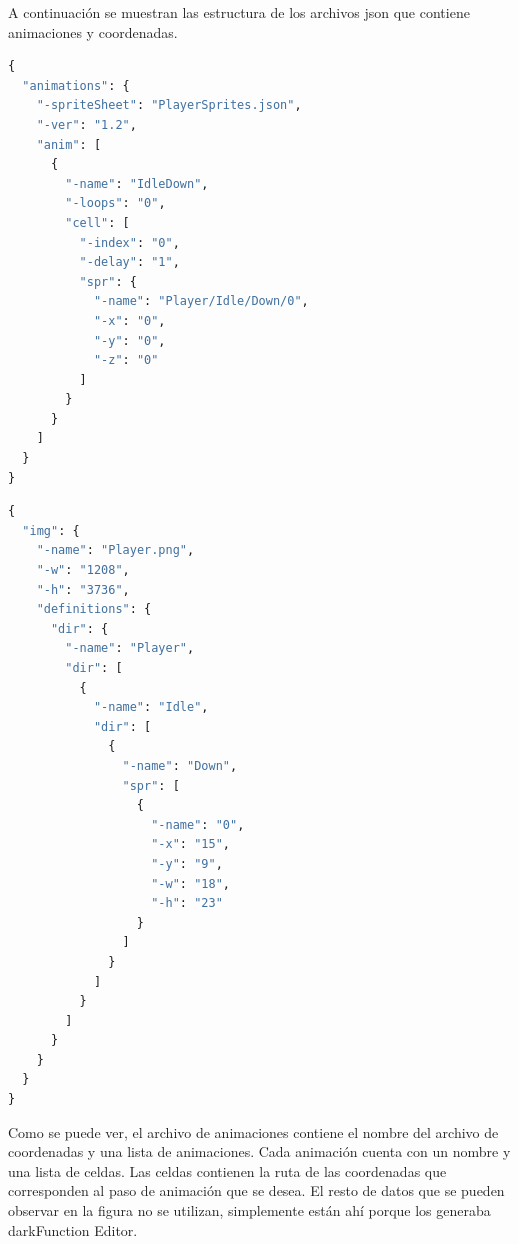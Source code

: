 		A continuación se muestran las estructura de los archivos \acrshort{json} que contiene animaciones y coordenadas.

		\begin{center}
		\begin{minipage}{.6\textwidth}
		\begin{lstlisting}[caption={Estructura de las animaciones en \acrshort{json}},label={lst:animjson},language=Python]
{
  "animations": {
    "-spriteSheet": "PlayerSprites.json",
    "-ver": "1.2",
    "anim": [
      {
        "-name": "IdleDown",
        "-loops": "0",
        "cell": [
          "-index": "0",
          "-delay": "1",
          "spr": {
            "-name": "Player/Idle/Down/0",
            "-x": "0",
            "-y": "0",
            "-z": "0"
          ]
        }
      }
    ]
  }
}    
		\end{lstlisting}
		\end{minipage}
		\end{center}

		\begin{center}
		\begin{minipage}{.6\textwidth}
		\begin{lstlisting}[caption={Estructura de las coordenadas en \acrshort{json}},label={lst:coorjson},language=Python]
{
  "img": {
    "-name": "Player.png",
    "-w": "1208",
    "-h": "3736",
    "definitions": {
      "dir": {
        "-name": "Player",
        "dir": [
          {
            "-name": "Idle",
            "dir": [
              {
                "-name": "Down",
                "spr": [
                  {
                    "-name": "0",
                    "-x": "15",
                    "-y": "9",
                    "-w": "18",
                    "-h": "23"
                  }
                ]
              }
            ]
          }
        ]
      }
    }
  }
}      
		\end{lstlisting}
		\end{minipage}
		\end{center}

		\FloatBarrier

		Como se puede ver, el archivo de animaciones contiene el nombre del archivo de coordenadas y una lista de animaciones. Cada animación cuenta con un nombre y una lista de celdas. Las celdas contienen la ruta de las coordenadas que corresponden al paso de animación que se desea. El resto de datos que se pueden observar en la figura no se utilizan, simplemente están ahí porque los generaba darkFunction Editor.

